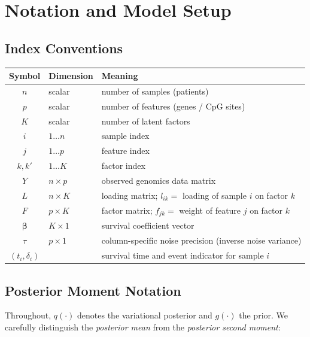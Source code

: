 \documentclass[11pt]{article}
\begin{document}
\section{Notation and Model Setup}

\subsection{Index Conventions}

\begin{center}
\begin{tabular}{cll}
\toprule
Symbol & Dimension & Meaning \\
\midrule
$n$ & scalar & number of samples (patients) \\
$p$ & scalar & number of features (genes / CpG sites) \\
$K$ & scalar & number of latent factors \\
$i$ & $1\ldots n$ & sample index \\
$j$ & $1\ldots p$ & feature index \\
$k, k'$ & $1\ldots K$ & factor index \\
$Y$ & $n\times p$ & observed genomics data matrix \\
$L$ & $n\times K$ & loading matrix; $l_{ik} =$ loading of sample $i$ on factor $k$ \\
$F$ & $p\times K$ & factor matrix; $f_{jk} =$ weight of feature $j$ on factor $k$ \\
$\bm{\beta}$ & $K\times 1$ & survival coefficient vector \\
$\tau$ & $p\times 1$ & column-specific noise precision (inverse noise variance) \\
$(t_i,\delta_i)$ & & survival time and event indicator for sample $i$ \\
\bottomrule
\end{tabular}
\end{center}

\subsection{Posterior Moment Notation}

Throughout, $q(\cdot)$ denotes the variational posterior and $g(\cdot)$ the
prior.  We carefully distinguish the \emph{posterior mean} from the
\emph{posterior second moment}:
\end{document}
